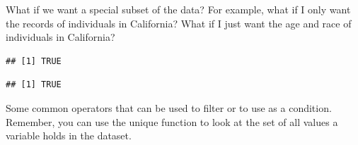 \documentclass[
]{book}
\newenvironment{Shaded}{\begin{snugshade}}{\end{snugshade}}
\newcommand{\CommentTok}[1]{\textcolor[rgb]{0.56,0.35,0.01}{\textit{#1}}}
\newcommand{\KeywordTok}[1]{\textcolor[rgb]{0.13,0.29,0.53}{\textbf{#1}}}
\newcommand{\NormalTok}[1]{#1}
\newcommand{\OperatorTok}[1]{\textcolor[rgb]{0.81,0.36,0.00}{\textbf{#1}}}
\newcommand{\StringTok}[1]{\textcolor[rgb]{0.31,0.60,0.02}{#1}}
\theoremstyle{definition}
\theoremstyle{definition}
\theoremstyle{definition}
\theoremstyle{definition}
\theoremstyle{remark}
\begin{document}
What if we want a special subset of the data? For example, what if I only want the records of individuals in California? What if I just want the age and race of individuals in California?

\begin{Shaded}
\end{Shaded}

\begin{verbatim}
## [1] TRUE
\end{verbatim}

\begin{Shaded}
\end{Shaded}

\begin{verbatim}
## [1] TRUE
\end{verbatim}

Some common operators that can be used to filter or to use as a condition. Remember, you can use the unique function to look at the set of all values a variable holds in the dataset.
\end{document}
